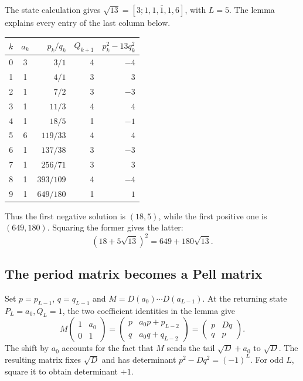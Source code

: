 \begin{example}[An odd period: $D=13$]
The state calculation gives
$\sqrt{13}=[3;\overline{1,1,1,1,6}]$, with $L=5$.
The lemma explains every entry of the last column below.
\begin{center}
\begin{tabular}{ccrrr}
\toprule
$k$ & $a_k$ & $p_k/q_k$ & $Q_{k+1}$ & $p_k^2-13q_k^2$\\
\midrule
0 & 3 & $3/1$ & 4 & $-4$\\
1 & 1 & $4/1$ & 3 & $3$\\
2 & 1 & $7/2$ & 3 & $-3$\\
3 & 1 & $11/3$ & 4 & $4$\\
4 & 1 & $18/5$ & 1 & $-1$\\
5 & 6 & $119/33$ & 4 & $4$\\
6 & 1 & $137/38$ & 3 & $-3$\\
7 & 1 & $256/71$ & 3 & $3$\\
8 & 1 & $393/109$ & 4 & $-4$\\
9 & 1 & $649/180$ & 1 & $1$\\
\bottomrule
\end{tabular}
\end{center}
Thus the first negative solution is $(18,5)$, while the first positive
one is $(649,180)$. Squaring the former gives the latter:
\[
 (18+5\sqrt{13})^2=649+180\sqrt{13}.
\]
\end{example}

\subsection*{The period matrix becomes a Pell matrix}
Set $p=p_{L-1}$, $q=q_{L-1}$ and
$M=D(a_0)\cdots D(a_{L-1})$. At the returning state $P_L=a_0,Q_L=1$,
the two coefficient identities in the lemma give
\[
 M\begin{pmatrix}1&a_0\\0&1\end{pmatrix}
 =\begin{pmatrix}p&a_0p+p_{L-2}\\q&a_0q+q_{L-2}\end{pmatrix}
 =\begin{pmatrix}p&Dq\\q&p\end{pmatrix}.
\]
The shift by $a_0$ accounts for the fact that $M$ sends the tail
$\sqrt D+a_0$ to $\sqrt D$. The resulting matrix fixes $\sqrt D$ and
has determinant $p^2-Dq^2=(-1)^L$. For odd $L$, square it to obtain
determinant $+1$.

